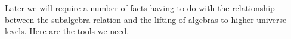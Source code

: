 \begin{code}
\>[0]\AgdaSpace{}%
\AgdaSymbol{:}\AgdaSpace{}%
\>[777I]\AgdaSymbol{\{}\AgdaSpace{}%
\AgdaSpace{}%
\AgdaSpace{}%
\AgdaSymbol{:}\AgdaSpace{}%
\AgdaSymbol{\}(}\AgdaSpace{}%
\AgdaSymbol{:}\AgdaSpace{}%
\AgdaSpace{}%
\AgdaSpace{}%
\AgdaSymbol{)\{}\AgdaSpace{}%
\AgdaSpace{}%
\AgdaSymbol{:}\AgdaSpace{}%
\AgdaSpace{}%
\AgdaSymbol{(}\AgdaSpace{}%
\AgdaSpace{}%
\AgdaSymbol{)}\AgdaSpace{}%
\AgdaSymbol{\}}\<%
\\
\>[0][@{}l@{\AgdaIndent{0}}]%
\>[1]%
%
\>[9]\AgdaSpace{}%
\AgdaSpace{}%
\AgdaSpace{}%
\AgdaSpace{}%
\AgdaSpace{}%
\AgdaSpace{}%
\AgdaSpace{}%
\AgdaSpace{}%
\AgdaSpace{}%
\AgdaSpace{}%
\<%
\\
%
\>[0]\AgdaSpace{}%
\AgdaSpace{}%
\AgdaSpace{}%
\AgdaSpace{}%
\AgdaSymbol{=}\AgdaSpace{}%
\AgdaSpace{}%
\AgdaSpace{}%
\AgdaSpace{}%
\AgdaOperator{\AgdaInductiveConstructor{,}}\AgdaSpace{}%
\AgdaSpace{}%
\AgdaSpace{}%
\AgdaSpace{}%
\AgdaSpace{}%
\AgdaOperator{\AgdaInductiveConstructor{,}}\AgdaSpace{}%
\AgdaSpace{}%
\AgdaSymbol{(}\AgdaSpace{}%
\AgdaSpace{}%
\AgdaSpace{}%
\AgdaSpace{}%
\AgdaSpace{}%
\AgdaSymbol{)}\AgdaSpace{}%
\AgdaOperator{\AgdaInductiveConstructor{,}}\AgdaSpace{}%
\AgdaSpace{}%
\AgdaSymbol{(}\AgdaSpace{}%
\AgdaSpace{}%
\AgdaSpace{}%
\AgdaSymbol{)}\AgdaSpace{}%
\<%
\end{code}
\ccpad
Later we will require a number of facts having to do with the relationship between the subalgebra relation and the lifting of algebras to higher universe levels.  Here are the tools we need.

